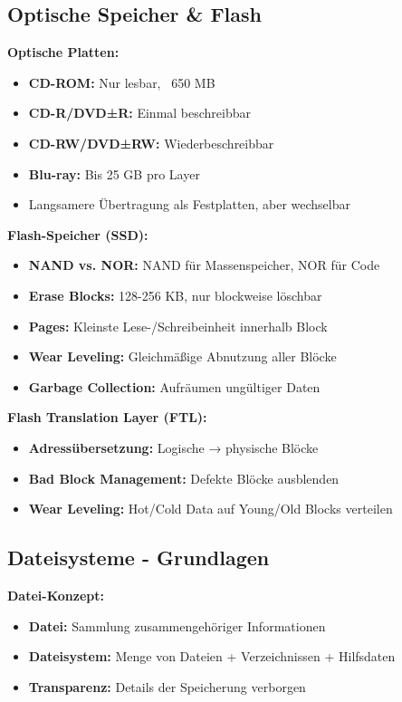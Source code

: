 \documentclass[9pt,a4paper]{extarticle}
\begin{document}
\begin{multicols*}{2}
\subsection{Optische Speicher \& Flash}
\textbf{Optische Platten:}
\begin{itemize}
\item \textbf{CD-ROM:} Nur lesbar, ~650 MB
\item \textbf{CD-R/DVD±R:} Einmal beschreibbar
\item \textbf{CD-RW/DVD±RW:} Wiederbeschreibbar
\item \textbf{Blu-ray:} Bis 25 GB pro Layer
\item Langsamere Übertragung als Festplatten, aber wechselbar
\end{itemize}

\textbf{Flash-Speicher (SSD):}
\begin{itemize}
\item \textbf{NAND vs. NOR:} NAND für Massenspeicher, NOR für Code
\item \textbf{Erase Blocks:} 128-256 KB, nur blockweise löschbar
\item \textbf{Pages:} Kleinste Lese-/Schreibeinheit innerhalb Block
\item \textbf{Wear Leveling:} Gleichmäßige Abnutzung aller Blöcke
\item \textbf{Garbage Collection:} Aufräumen ungültiger Daten
\end{itemize}

\textbf{Flash Translation Layer (FTL):}
\begin{itemize}
\item \textbf{Adressübersetzung:} Logische → physische Blöcke
\item \textbf{Bad Block Management:} Defekte Blöcke ausblenden
\item \textbf{Wear Leveling:} Hot/Cold Data auf Young/Old Blocks verteilen
\end{itemize}

\subsection{Dateisysteme - Grundlagen}
\textbf{Datei-Konzept:}
\begin{itemize}
\item \textbf{Datei:} Sammlung zusammengehöriger Informationen
\item \textbf{Dateisystem:} Menge von Dateien + Verzeichnissen + Hilfsdaten
\item \textbf{Transparenz:} Details der Speicherung verborgen
\end{itemize}


\end{multicols*}
\end{document}
